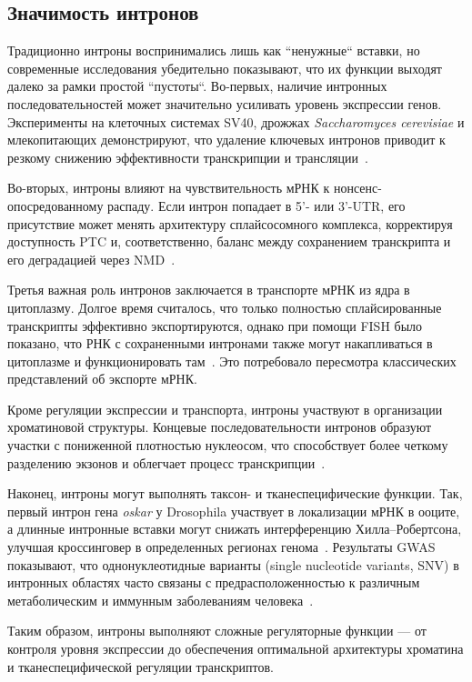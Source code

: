 \subsection{Значимость интронов}

Традиционно интроны воспринимались лишь как ``ненужные`` вставки, но современные исследования убедительно показывают, что их функции выходят далеко за рамки простой ``пустоты``.
Во-первых, наличие интронных последовательностей может значительно усиливать уровень экспрессии генов.
Эксперименты на клеточных системах SV40, дрожжах \textit{Saccharomyces cerevisiae} и млекопитающих демонстрируют, что удаление ключевых интронов приводит к резкому снижению эффективности транскрипции и трансляции~\cite{Gruss1979,Juneau2006}.

Во-вторых, интроны влияют на чувствительность мРНК к нонсенс-опосредованному распаду.
Если интрон попадает в 5'- или 3'-UTR, его присутствие может менять архитектуру сплайсосомного комплекса, корректируя доступность PTC и, соответственно, баланс между сохранением транскрипта и его деградацией через NMD~\cite{Jo2015,Kalyna2012}.

Третья важная роль интронов заключается в транспорте мРНК из ядра в цитоплазму.
Долгое время считалось, что только полностью сплайсированные транскрипты эффективно экспортируются, однако при помощи FISH было показано, что РНК с сохраненными интронами также могут накапливаться в цитоплазме и функционировать там~\cite{Valencia2008,Jo2015,Roy2006}.
Это потребовало пересмотра классических представлений об экспорте мРНК.

Кроме регуляции экспрессии и транспорта, интроны участвуют в организации хроматиновой структуры.
Концевые последовательности интронов образуют участки с пониженной плотностью нуклеосом, что способствует более четкому разделению экзонов и облегчает процесс транскрипции~\cite{Schwartz2009}.

Наконец, интроны могут выполнять таксон- и тканеспецифические функции.
Так, первый интрон гена \textit{oskar} у Drosophila участвует в локализации мРНК в ооците, а длинные интронные вставки могут снижать интерференцию Хилла–Робертсона, улучшая кроссинговер в определенных регионах генома~\cite{Comeron2008}.
Результаты GWAS показывают, что однонуклеотидные варианты (single nucleotide variants, SNV) в интронных областях часто связаны с предрасположенностью к различным метаболическим и иммунным заболеваниям человека~\cite{Welter2014}.

Таким образом, интроны выполняют сложные регуляторные функции — от контроля уровня экспрессии до обеспечения оптимальной архитектуры хроматина и тканеспецифической регуляции транскриптов.


